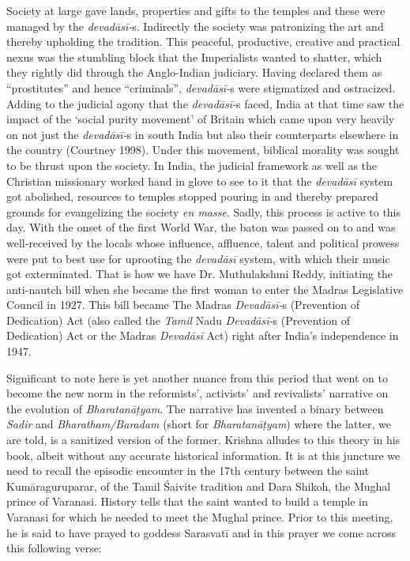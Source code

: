 Society at large gave lands, properties and gifts to the temples and these were managed by the \textit{devadāsī-}s. Indirectly the society was patronizing the art and thereby upholding the tradition. This peaceful, productive, creative and practical nexus was the stumbling block that the Imperialists wanted to shatter, which they rightly did through the Anglo-Indian judiciary. Having declared them as “prostitutes” and hence “criminals”, \textit{devadāsī-}s were stigmatized and ostracized. Adding to the judicial agony that the \textit{devadāsī-}s faced, India at that time saw the impact of the ‘social purity movement’ of Britain which came upon very heavily on not just the \textit{devadāsī-}s in south India but also their counterparts elsewhere in the country (Courtney 1998). Under this movement, biblical morality was sought to be thrust upon the society. In India, the judicial framework as well as the Christian missionary worked hand in glove to see to it that the \textit{devadāsī} system got abolished, resources to temples stopped pouring in and thereby prepared grounds for evangelizing the society \textit{en masse}. Sadly, this process is active to this day. With the onset of the first World War, the baton was passed on to and was well-received by the locals whose influence, affluence, talent and political prowess were put to best use for uprooting the \textit{devadāsī} system, with which their music got exterminated. That is how we have Dr. Muthulakshmi Reddy, initiating the anti-nautch bill when she became the first woman to enter the Madras Legislative Council in 1927. This bill became The Madras \textit{Devadāsī-}s (Prevention of Dedication) Act (also called the \textit{Tamil} Nadu \textit{Devadāsī-}s (Prevention of Dedication) Act or the Madras \textit{Devadāsī} Act) right after India’s independence in 1947.

Significant to note here is yet another nuance from this period that went on to become the new norm in the reformists’, activists’ and revivalists’ narrative on the evolution of \textit{Bharatanāṭyam}. The narrative has invented a binary between \textit{Sadir} and \textit{Bharatham/Baradam }(short for\textit{ Bharatanāṭyam}) where the latter, we are told, is a sanitized version of the former. Krishna alludes to this theory in his book, albeit without any accurate historical information. It is at this juncture we need to recall the episodic encounter in the 17th century between the saint Kumāraguruparar, of the Tamil Śaivite tradition and Dara Shikoh, the Mughal prince of Varanasi. History tells that the saint wanted to build a temple in Varanasi for which he needed to meet the Mughal prince. Prior to this meeting, he is said to have prayed to goddess Sarasvatī and in this prayer we come across this following verse:

